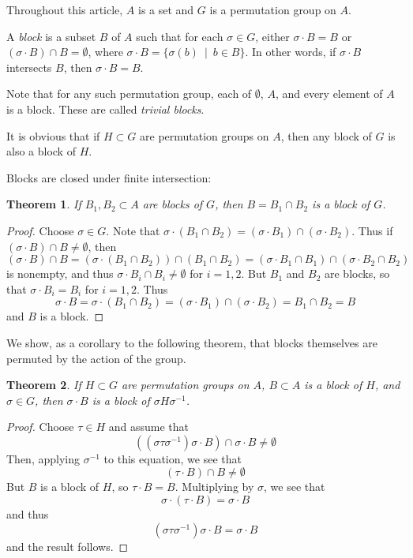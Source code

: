 \documentclass[12pt]{article}
\newtheorem*{thm}{Theorem}
\theoremstyle{definition}
\begin{document}
Throughout this article, $A$ is a set and $G$ is a permutation group on $A$.

A \emph{block} is a subset $B$ of $A$ such that for each $\sigma\in G$, either $\sigma\cdot B=B$ or $(\sigma\cdot B)\cap B=\emptyset$, where $\sigma\cdot B=\{\sigma(b)\ \mid\ b\in B\}$. In other words, if $\sigma\cdot B$ intersects $B$, then $\sigma\cdot B = B$.

Note that for any such permutation group, each of $\emptyset$, $A$, and every element of $A$ is a block. These are called \emph{trivial blocks}.

It is obvious that if $H\subset G$ are permutation groups on $A$, then any block of $G$ is also a block of $H$.

Blocks are closed under finite intersection:
\begin{thm} If $B_1, B_2\subset A$ are blocks of $G$, then $B=B_1\cap B_2$ is a block of $G$.
\end{thm}
\begin{proof} Choose $\sigma\in G$.
Note that $\sigma\cdot(B_1\cap B_2)=(\sigma\cdot B_1)\cap (\sigma\cdot B_2)$. Thus if $(\sigma\cdot B)\cap B\neq\emptyset$, then
\[(\sigma\cdot B)\cap B = (\sigma\cdot (B_1\cap B_2))\cap(B_1\cap B_2)=(\sigma\cdot B_1 \cap B_1)\cap (\sigma\cdot B_2\cap B_2)\]
is nonempty, and thus $\sigma\cdot B_i \cap B_i\neq\emptyset$ for $i=1,2$. But $B_1$ and $B_2$ are blocks, so that $\sigma\cdot B_i=B_i$ for $i=1,2$. Thus 
\[\sigma\cdot B  = \sigma\cdot (B_1\cap B_2) = (\sigma\cdot B_1)\cap (\sigma\cdot B_2)=B_1\cap B_2=B\]
and $B$ is a block.
\end{proof}

We show, as a corollary to the following theorem, that blocks themselves are permuted by the action of the group.
\begin{thm} If $H\subset G$ are permutation groups on $A$, $B\subset A$ is a block of $H$, and $
\sigma\in G$, then $\sigma\cdot B$ is a block of $\sigma H\sigma^{-1}$.
\end{thm}
\begin{proof}
Choose $\tau\in H$ and assume that
\[((\sigma \tau\sigma^{-1})\sigma\cdot B)\cap \sigma\cdot B\neq\emptyset\]
Then, applying $\sigma^{-1}$ to this equation, we see that
\[(\tau\cdot B)\cap B\neq\emptyset\]
But $B$ is a block of $H$, so $\tau\cdot B=B$. Multiplying by $\sigma$, we see that
\[\sigma\cdot(\tau\cdot B)=\sigma\cdot B\]
and thus
\[(\sigma\tau\sigma^{-1})\sigma\cdot B=\sigma\cdot B\]
and the result follows.
\end{proof}
\end{document}
